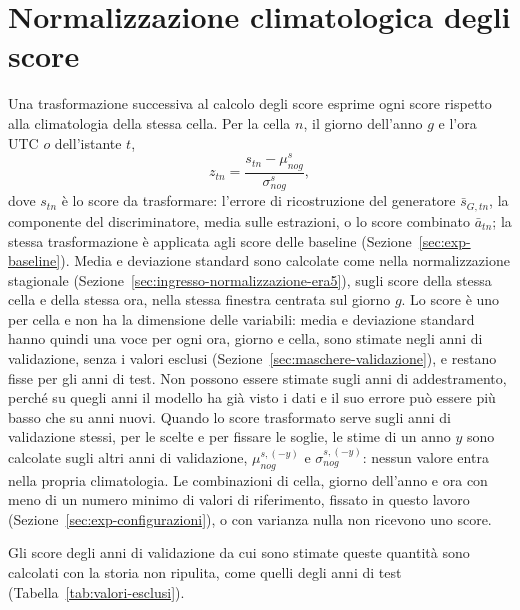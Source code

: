 \section{Normalizzazione climatologica degli score}
\label{sec:normalizzazione-climatologica-score}

Una trasformazione successiva al calcolo degli score esprime ogni score rispetto alla climatologia della stessa cella. Per la cella $n$, il giorno dell'anno $g$ e l'ora UTC $o$ dell'istante $t$,
\begin{equation}
z_{tn}=\frac{s_{tn}-\mu^{s}_{nog}}{\sigma^{s}_{nog}},
\end{equation}
dove $s_{tn}$ è lo score da trasformare: l'errore di ricostruzione del generatore $\bar{s}_{G,tn}$, la componente del discriminatore, media sulle estrazioni, o lo score combinato $\bar{a}_{tn}$; la stessa trasformazione è applicata agli score delle baseline (Sezione~\ref{sec:exp-baseline}). Media e deviazione standard sono calcolate come nella normalizzazione stagionale (Sezione~\ref{sec:ingresso-normalizzazione-era5}), sugli score della stessa cella e della stessa ora, nella stessa finestra centrata sul giorno $g$. Lo score è uno per cella e non ha la dimensione delle variabili: media e deviazione standard hanno quindi una voce per ogni ora, giorno e cella, sono stimate negli anni di validazione, senza i valori esclusi (Sezione~\ref{sec:maschere-validazione}), e restano fisse per gli anni di test. Non possono essere stimate sugli anni di addestramento, perché su quegli anni il modello ha già visto i dati e il suo errore può essere più basso che su anni nuovi. Quando lo score trasformato serve sugli anni di validazione stessi, per le scelte e per fissare le soglie, le stime di un anno $y$ sono calcolate sugli altri anni di validazione, $\mu^{s,(-y)}_{nog}$ e $\sigma^{s,(-y)}_{nog}$: nessun valore entra nella propria climatologia. Le combinazioni di cella, giorno dell'anno e ora con meno di un numero minimo di valori di riferimento, fissato in questo lavoro (Sezione~\ref{sec:exp-configurazioni}), o con varianza nulla non ricevono uno score.

Gli score degli anni di validazione da cui sono stimate queste quantità sono calcolati con la storia non ripulita, come quelli degli anni di test (Tabella~\ref{tab:valori-esclusi}).

